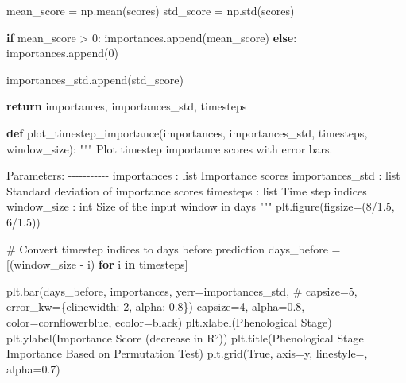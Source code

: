 \documentclass[
  letterpaper,
  DIV=11,
  numbers=noendperiod]{scrreprt}
\newenvironment{Shaded}{\begin{snugshade}}{\end{snugshade}}
\newcommand{\CommentTok}[1]{\textcolor[rgb]{0.37,0.37,0.37}{#1}}
\newcommand{\ControlFlowTok}[1]{\textcolor[rgb]{0.00,0.23,0.31}{\textbf{#1}}}
\newcommand{\DecValTok}[1]{\textcolor[rgb]{0.68,0.00,0.00}{#1}}
\newcommand{\FloatTok}[1]{\textcolor[rgb]{0.68,0.00,0.00}{#1}}
\newcommand{\KeywordTok}[1]{\textcolor[rgb]{0.00,0.23,0.31}{\textbf{#1}}}
\newcommand{\NormalTok}[1]{\textcolor[rgb]{0.00,0.23,0.31}{#1}}
\newcommand{\OperatorTok}[1]{\textcolor[rgb]{0.37,0.37,0.37}{#1}}
\newcommand{\StringTok}[1]{\textcolor[rgb]{0.13,0.47,0.30}{#1}}
\newcommand{\VariableTok}[1]{\textcolor[rgb]{0.07,0.07,0.07}{#1}}
\begin{document}
\begin{Shaded}
\begin{Highlighting}[]
\NormalTok{        mean\_score }\OperatorTok{=}\NormalTok{ np.mean(scores)}
\NormalTok{        std\_score }\OperatorTok{=}\NormalTok{ np.std(scores)}

        \ControlFlowTok{if}\NormalTok{ mean\_score }\OperatorTok{\textgreater{}} \DecValTok{0}\NormalTok{:}
\NormalTok{            importances.append(mean\_score)}
        \ControlFlowTok{else}\NormalTok{:}
\NormalTok{            importances.append(}\DecValTok{0}\NormalTok{)}

\NormalTok{        importances\_std.append(std\_score)}

    \ControlFlowTok{return}\NormalTok{ importances, importances\_std, timesteps}

\KeywordTok{def}\NormalTok{ plot\_timestep\_importance(importances, importances\_std, timesteps, window\_size):}
    \CommentTok{"""}
\CommentTok{    Plot timestep importance scores with error bars.}

\CommentTok{    Parameters:}
\CommentTok{    {-}{-}{-}{-}{-}{-}{-}{-}{-}{-}{-}}
\CommentTok{    importances : list}
\CommentTok{        Importance scores}
\CommentTok{    importances\_std : list}
\CommentTok{        Standard deviation of importance scores}
\CommentTok{    timesteps : list}
\CommentTok{        Time step indices}
\CommentTok{    window\_size : int}
\CommentTok{        Size of the input window in days}
\CommentTok{    """}
\NormalTok{    plt.figure(figsize}\OperatorTok{=}\NormalTok{(}\DecValTok{8}\OperatorTok{/}\FloatTok{1.5}\NormalTok{, }\DecValTok{6}\OperatorTok{/}\FloatTok{1.5}\NormalTok{))}

    \CommentTok{\# Convert timestep indices to days before prediction}
\NormalTok{    days\_before }\OperatorTok{=}\NormalTok{ [(window\_size }\OperatorTok{{-}}\NormalTok{ i) }\ControlFlowTok{for}\NormalTok{ i }\KeywordTok{in}\NormalTok{ timesteps]}

\NormalTok{    plt.bar(days\_before, importances, yerr}\OperatorTok{=}\NormalTok{importances\_std,}
            \CommentTok{\# capsize=5, error\_kw=\{\textquotesingle{}elinewidth\textquotesingle{}: 2, \textquotesingle{}alpha\textquotesingle{}: 0.8\})}
\NormalTok{            capsize}\OperatorTok{=}\DecValTok{4}\NormalTok{, alpha}\OperatorTok{=}\FloatTok{0.8}\NormalTok{, color}\OperatorTok{=}\StringTok{\textquotesingle{}cornflowerblue\textquotesingle{}}\NormalTok{, ecolor}\OperatorTok{=}\StringTok{\textquotesingle{}black\textquotesingle{}}\NormalTok{)}
\NormalTok{    plt.xlabel(}\StringTok{\textquotesingle{}Phenological Stage\textquotesingle{}}\NormalTok{)}
\NormalTok{    plt.ylabel(}\StringTok{\textquotesingle{}Importance Score (decrease in R²)\textquotesingle{}}\NormalTok{)}
\NormalTok{    plt.title(}\StringTok{\textquotesingle{}Phenological Stage Importance Based on Permutation Test\textquotesingle{}}\NormalTok{)}
\NormalTok{    plt.grid(}\VariableTok{True}\NormalTok{, axis}\OperatorTok{=}\StringTok{\textquotesingle{}y\textquotesingle{}}\NormalTok{, linestyle}\OperatorTok{=}\StringTok{\textquotesingle{}{-}{-}\textquotesingle{}}\NormalTok{, alpha}\OperatorTok{=}\FloatTok{0.7}\NormalTok{)}


\end{Highlighting}
\end{Shaded}
\end{document}
